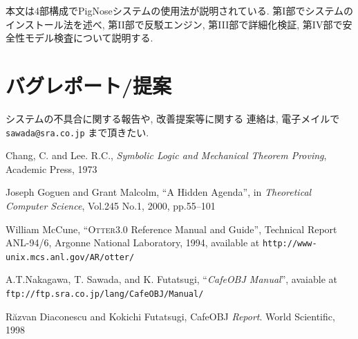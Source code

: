 \documentclass[a4paper,oneside]{memoir}
\begin{document}

本文は4部構成でPigNoseシステムの使用法が説明されている.
第I部でシステムのインストール法を述べ, 第II部で反駁エンジン,
第III部で詳細化検証, 第IV部で安全性モデル検査について説明する.

\section*{バグレポート/提案}

システムの不具合に関する報告や, 改善提案等に関する
連絡は, 電子メイルで \texttt{sawada@sra.co.jp} まで頂きたい.

\newpage
\tableofcontents
\newpage
{}
\mainmatter







\newpage

\begin{center}
\begin{thebibliography}{99}\itemsep=0pt

 Chang, C. and Lee. R.C.,
  \textsl{Symbolic Logic and Mechanical Theorem Proving},
  Academic Press, 1973

 Joseph Goguen and Grant Malcolm, ``A Hidden Agenda'', in
  \emph{Theoretical Computer Science}, Vol.245 No.1, 2000, pp.55--101

 William McCune, ``\textsc{Otter3.0} Reference Manual
  and Guide'', Technical Report ANL-94/6, Argonne National Laboratory,
  1994, available at \texttt{http://www-unix.mcs.anl.gov/AR/otter/}

 A.T.Nakagawa, T. Sawada, and K. Futatsugi,
  ``\textsl{CafeOBJ Manual}'', avaiable at 
  \texttt{ftp://ftp.sra.co.jp/lang/CafeOBJ/Manual/}

 R\u{a}zvan Diaconescu and Kokichi Futatsugi,
  \textsf{CafeOBJ} \emph{Report}. World Scientific, 1998

\end{thebibliography}
\end{center}
\end{document}
